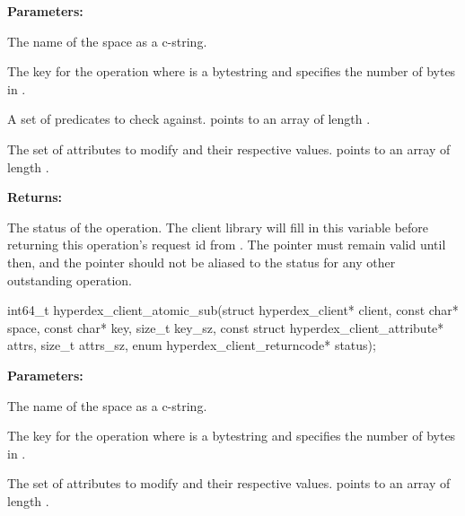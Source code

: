 \noindent\textbf{Parameters:}
\begin{description}[labelindent=\widthof{{\code{checks}, \code{checks\_sz}}},leftmargin=*,noitemsep,nolistsep,align=right]
\item[\code{space}] The name of the space as a c-string.
\item[\code{key}, \code{key\_sz}] The key for the operation where  is a bytestring and  specifies the number of bytes in .
\item[\code{checks}, \code{checks\_sz}] A set of predicates to check against.   points to an array of length .
\item[\code{attrs}, \code{attrs\_sz}] The set of attributes to modify and their respective values.   points to an array of length .
\end{description}

\noindent\textbf{Returns:}
\begin{description}[labelindent=\widthof{{\code{status}}},leftmargin=*,noitemsep,nolistsep,align=right]
\item[\code{status}] The status of the operation.  The client library will fill in this variable before returning this operation's request id from .  The pointer must remain valid until then, and the pointer should not be aliased to the status for any other outstanding operation.
\end{description}

\funcsep
{}
\begin{ccode}
int64_t hyperdex_client_atomic_sub(struct hyperdex_client* client,
                const char* space,
                const char* key, size_t key_sz,
                const struct hyperdex_client_attribute* attrs, size_t attrs_sz,
                enum hyperdex_client_returncode* status);
\end{ccode}
\funcdesc 

\noindent\textbf{Parameters:}
\begin{description}[labelindent=\widthof{{\code{attrs}, \code{attrs\_sz}}},leftmargin=*,noitemsep,nolistsep,align=right]
\item[\code{space}] The name of the space as a c-string.
\item[\code{key}, \code{key\_sz}] The key for the operation where  is a bytestring and  specifies the number of bytes in .
\item[\code{attrs}, \code{attrs\_sz}] The set of attributes to modify and their respective values.   points to an array of length .
\end{description}

